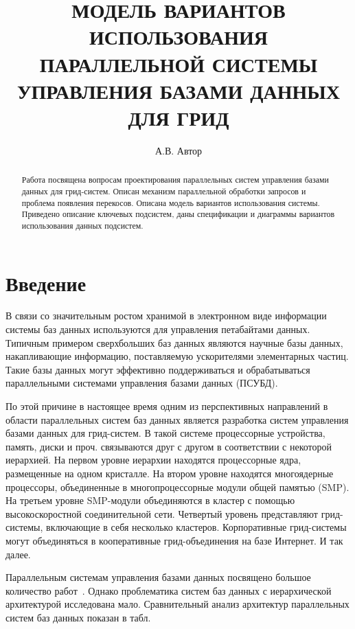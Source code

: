 \documentclass[11pt,oneside]{article}
\begin{document}
	\newcommand{\phan}{\hspace*{0cm}}
	\newcommand{\comment}{}

	\author{А.В. Автор}
	\title{МОДЕЛЬ ВАРИАНТОВ ИСПОЛЬЗОВАНИЯ ПАРАЛЛЕЛЬНОЙ СИСТЕМЫ УПРАВЛЕНИЯ БАЗАМИ ДАННЫХ ДЛЯ ГРИД}
	\maketitle{}

	\begin{abstract}
		Работа посвящена вопросам проектирования параллельных систем управления базами данных для грид-систем. Описан механизм параллельной обработки запросов и проблема появления перекосов. Описана модель вариантов использования системы. Приведено описание ключевых подсистем, даны спецификации и диаграммы вариантов использования данных подсистем.
	\end{abstract}


	
	\section*{Введение}
	\par В связи со значительным ростом хранимой в электронном виде информации системы баз данных используются для управления петабайтами данных. Типичным примером сверхбольших баз данных являются научные базы данных, накапливающие информацию, поставляемую ускорителями элементарных частиц. Такие базы данных могут эффективно поддерживаться и обрабатываться параллельными системами управления базами данных (ПСУБД).
	\par По этой причине в настоящее время одним из перспективных направлений в области параллельных систем баз данных является разработка систем управления базами данных для грид-систем. В такой системе процессорные устройства, память, диски и проч. связываются друг с другом в соответствии с некоторой иерархией. На первом уровне иерархии находятся процессорные ядра, размещенные на одном кристалле. На втором уровне находятся многоядерные процессоры, объединенные в многопроцессорные модули общей памятью (SMP). На третьем уровне SMP-модули объединяются в кластер с помощью высокоскоростной соединительной сети. Четвертый уровень представляют грид-системы, включающие в себя несколько кластеров. Корпоративные грид-системы могут объединяться в кооперативные грид-объединения на базе Интернет. И так далее.
	\par Параллельным системам управления базами данных посвящено большое количество работ~\cite{B_Gray2005, B_Mehta1997, B_Williams1998}. Однако проблематика систем баз данных с иерархической архитектурой исследована мало. Сравнительный анализ архитектур параллельных систем баз данных показан в табл. %
	
\end{document}
